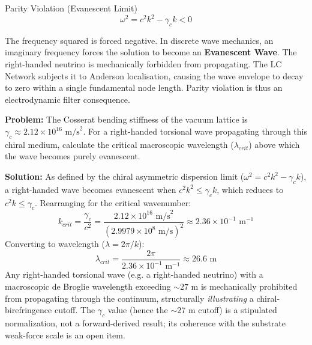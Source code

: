 \begin{resultbox}{Parity Violation (Evanescent Limit)}
\begin{equation}
    \omega^2 = c^2 k^2 - \gamma_c k < 0
\end{equation}
\end{resultbox}
The frequency squared is forced negative. In discrete wave mechanics, an imaginary frequency forces the solution to become an \textbf{Evanescent Wave}. The right-handed neutrino is mechanically forbidden from propagating. The LC Network subjects it to Anderson localisation, causing the wave envelope to decay to zero within a single fundamental node length. Parity violation is thus an electrodynamic filter consequence.

\begin{examplebox}
\textbf{Problem:} The Cosserat bending stiffness of the vacuum lattice is $\gamma_c \approx 2.12 \times 10^{16}\text{ m/s}^2$. For a right-handed torsional wave propagating through this chiral medium, calculate the critical macroscopic wavelength ($\lambda_{crit}$) above which the wave becomes purely evanescent.

\textbf{Solution:} As defined by the chiral asymmetric dispersion limit ($\omega^2 = c^2 k^2 - \gamma_c k$), a right-handed wave becomes evanescent when $c^2 k^2 \le \gamma_c k$, which reduces to $c^2 k \le \gamma_c$. 
Rearranging for the critical wavenumber:
\[ k_{crit} = \frac{\gamma_c}{c^2} = \frac{2.12 \times 10^{16}\text{ m/s}^2}{(2.9979 \times 10^8\text{ m/s})^2} \approx 2.36 \times 10^{-1}\text{ m}^{-1} \]
Converting to wavelength ($\lambda = 2\pi/k$):
\[ \lambda_{crit} = \frac{2\pi}{2.36 \times 10^{-1}\text{ m}^{-1}} \approx 26.6\text{ m} \]
Any right-handed torsional wave (e.g. a right-handed neutrino) with a macroscopic de Broglie wavelength exceeding $\sim 27\text{ m}$ is mechanically prohibited from propagating through the continuum, structurally \emph{illustrating} a chiral-birefringence cutoff. The $\gamma_c$ value (hence the $\sim 27\text{ m}$ cutoff) is a stipulated normalization, not a forward-derived result; its coherence with the substrate weak-force scale is an open item. %
\end{examplebox}

